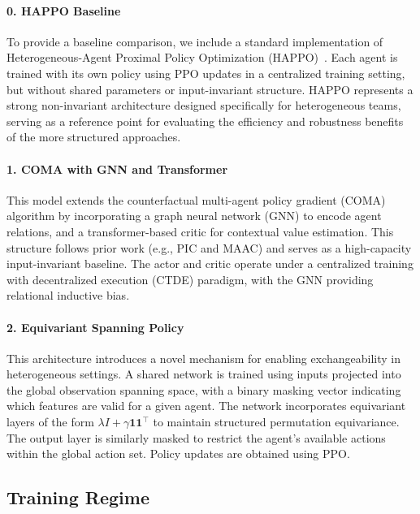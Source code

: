 \paragraph{0. HAPPO Baseline}
To provide a baseline comparison, we include a standard implementation 
of Heterogeneous-Agent Proximal Policy Optimization (HAPPO)~\cite{zhong2024}. 
Each agent is trained with its own policy using PPO updates in a centralized 
training setting, but without shared parameters or input-invariant structure. 
HAPPO represents a strong non-invariant architecture designed specifically 
for heterogeneous teams, serving as a reference point for evaluating the 
efficiency and robustness benefits of the more structured approaches.

\paragraph{1. COMA with GNN and Transformer}
This model extends the counterfactual multi-agent policy gradient (COMA) 
algorithm by incorporating a graph neural network (GNN) to encode agent relations, 
and a transformer-based critic for contextual value estimation. 
This structure follows prior work (e.g., PIC and MAAC) and 
serves as a high-capacity input-invariant baseline. 
The actor and critic operate under a centralized training with 
decentralized execution (CTDE) paradigm, with the GNN providing relational inductive bias.

\paragraph{2. Equivariant Spanning Policy}
This architecture introduces a novel mechanism for enabling 
exchangeability in heterogeneous settings. A shared network 
is trained using inputs projected into the global observation 
spanning space, with a binary masking vector indicating which 
features are valid for a given agent. The network incorporates 
equivariant layers of the form $\lambda I + \gamma \mathbf{11}^\top$ 
to maintain structured permutation equivariance. The output layer 
is similarly masked to restrict the agent's available actions 
within the global action set. Policy updates are obtained using PPO.


\subsection{Training Regime}

